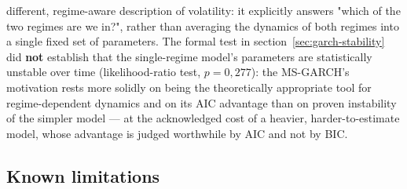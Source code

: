 \documentclass[12pt,a4paper]{article}
\begin{document}
\begin{econbox}
\begin{itemize}
		different, regime-aware description of volatility: it
		explicitly answers "which of the two regimes are we in?",
		rather than averaging the dynamics of both regimes into a single
		fixed set of parameters. The formal test in
		section~\ref{sec:garch-stability} did \textbf{not} establish that the
		single-regime model's parameters are statistically
		unstable over time (likelihood-ratio test,
		$p=0{,}277$): the MS-GARCH's motivation rests more solidly
		on being the theoretically appropriate tool for
		regime-dependent dynamics and on its AIC advantage than on
		proven instability of the simpler model --- at the acknowledged
		cost of a heavier, harder-to-estimate model, whose
		advantage is judged worthwhile by AIC and not by BIC.
	\end{itemize}
\end{econbox}

\subsection{Known limitations}
\end{document}
